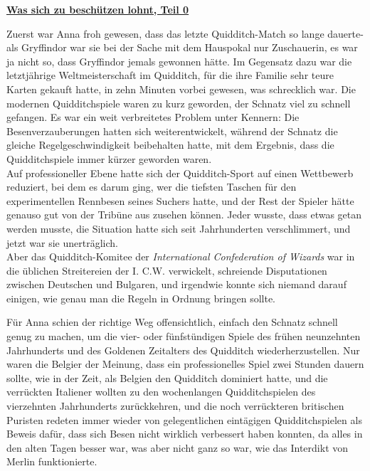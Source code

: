 

\hypertarget{was-sich-zu-beschuxfctzen-lohnt-teil-0}{%

\textbf{\uline{Was sich zu beschützen lohnt, Teil 0}}

\hfill\break Zuerst war Anna froh gewesen, dass das letzte Quidditch-Match so lange dauerte- als Gryffindor war sie bei der Sache mit dem Hauspokal nur Zuschauerin, es war ja nicht so, dass Gryffindor jemals gewonnen hätte. Im Gegensatz dazu war die letztjährige Weltmeisterschaft im Quidditch, für die ihre Familie sehr teure Karten gekauft hatte, in zehn Minuten vorbei gewesen, was schrecklich war. Die modernen Quidditchspiele waren zu kurz geworden, der Schnatz viel zu schnell gefangen. Es war ein weit verbreitetes Problem unter Kennern: Die Besenverzauberungen hatten sich weiterentwickelt, während der Schnatz die gleiche Regelgeschwindigkeit beibehalten hatte, mit dem Ergebnis, dass die Quidditchspiele immer kürzer geworden waren.\\ Auf professioneller Ebene hatte sich der Quidditch-Sport auf einen Wettbewerb reduziert, bei dem es darum ging, wer die tiefsten Taschen für den experimentellen Rennbesen seines Suchers hatte, und der Rest der Spieler hätte genauso gut von der Tribüne aus zusehen können. Jeder wusste, dass etwas getan werden musste, die Situation hatte sich seit Jahrhunderten verschlimmert, und jetzt war sie unerträglich.\\ Aber das Quidditch-Komitee der \emph{International Confederation of Wizards} war in die üblichen Streitereien der I. C.W. verwickelt, schreiende Disputationen zwischen Deutschen und Bulgaren, und irgendwie konnte sich niemand darauf einigen, wie genau man die Regeln in Ordnung bringen sollte.

Für Anna schien der richtige Weg offensichtlich, einfach den Schnatz schnell genug zu machen, um die vier- oder fünfstündigen Spiele des frühen neunzehnten Jahrhunderts und des Goldenen Zeitalters des Quidditch wiederherzustellen. Nur waren die Belgier der Meinung, dass ein professionelles Spiel zwei Stunden dauern sollte, wie in der Zeit, als Belgien den Quidditch dominiert hatte, und die verrückten Italiener wollten zu den wochenlangen Quidditchspielen des vierzehnten Jahrhunderts zurückkehren, und die noch verrückteren britischen Puristen redeten immer wieder von gelegentlichen eintägigen Quidditchspielen als Beweis dafür, dass sich Besen nicht wirklich verbessert haben konnten, da alles in den alten Tagen besser war, was aber nicht ganz so war, wie das Interdikt von Merlin funktionierte.

}
